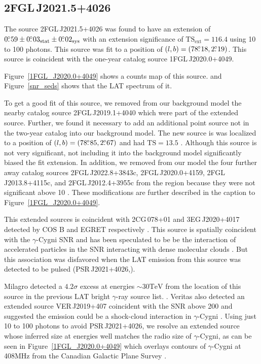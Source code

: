 \documentclass[12pt,preprint]{aastex}
\newcommand{\gev}{\text{GeV}\xspace}
\newcommand{\tev}{\text{TeV}\xspace}
\newcommand{\tsext}{{\ensuremath{\text{TS}_{\text{ext}}}}\xspace}
\newcommand{\ts}{\text{TS}\xspace}
\newcommand{\sys}{\text{sys}\xspace}
\newcommand{\stat}{\text{stat}\xspace}
\newcommand{\hl}[1]{#1}
\begin{document}
\subsection{2FGL\,J2021.5+4026}
\label{section_2FGL J2021.5+4026}



The source 2FGL\,J2021.5+4026 was found 
to have an extension of $0\fdg59\pm0\fdg03_\stat\pm0\fdg02_\sys$
with an extension significance of $\tsext=116.4$
using 10 \gev to 100 \gev photons.  This source was
fit to a position of $(l,b)=(78\mbox{$.\!\!^\circ$}18,2\mbox{$.\!\!^\circ$}19)$.  This source
is coincident with the one-year catalog source 1FGL\,J2020.0+4049.
\hl{
Figure~\ref{1FGL_J2020.0+4049} shows a counts map of this source.
and Figure~\ref{snr_seds} shows that the LAT spectrum of it.
}

To get a good fit of this source, we removed from our background
model the nearby catalog
source 2FGL\,J2019.1+4040 which were part of the extended source.
Further, we found it necessary to add an additional point source not in
the two-year catalog into our background model.  The new source is was
localized to a position of $(l,b)=(78\mbox{$.\!\!^\circ$}85,2\mbox{$.\!\!^\circ$}67)$ and had $\ts=13.5$ .
Although this source is not very significant, not including it into the
background model significantly biased the fit extension.
In addition, we removed from our model the four further away catalog
sources 2FGL\,J2022.8+3843c, 2FGL\,J2020.0+4159, 2FGL\,J2013.8+4115c,
and 2FGL\,J2012.4+3955c from the region because they were not significant
above 10 \gev.  These modifications are further described in the caption to
Figure~\ref{1FGL_J2020.0+4049}.


\hl{
This extended sources is coincident with 2CG\,078+01 and
3EG\,J2020+4017 detected by COS B and EGRET respectively
\citep{second_cos_b_catalog,third_egret_catalog}.  This source is
spatially coincident with the $\gamma$-Cygni SNR and has been speculated
to be be the interaction of accelerated particles in the SNR interacting
with dense molecular clouds \citep{pollock_1985,gaisser_1998}.  But this
association was disfavored when the LAT \gev emission from this source
was detected to be pulsed 
(PSR\,J2021+4026,\cite{first_lat_pulsar_cat}).

Milagro detected a $4.2\sigma$ excess at energies $\sim 30 \tev$ from the
location of this source in the previous LAT bright $\gamma$-ray source
list. \cite{lat_bsl,milagro_bright_source_list}.  Veritas also detected
an extended source VER\,J2019+407 coincident with the SNR above 200 \gev
and suggested the \tev emission could be a shock-cloud interaction in
$\gamma$-Cygni \citep{veritas_gamma_cygni}.  Using just 10 \gev to 100
\gev photons to avoid PSR\,J2021+4026, we resolve an extended source
whose inferred size at \gev energies well matches the radio size of
$\gamma$-Cygni, as can be seen in Figure~\ref{1FGL_J2020.0+4049} which
overlays contours of $\gamma$-Cygni at 408MHz from the Canadian Galactic
Plane Survey \citep{canadian_galactic_plane_survey}.
}
\end{document}

